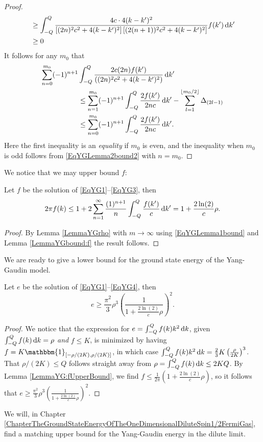 \begin{proof}
\begin{equation}
\begin{aligned}
&\geq \int_{-Q}^{Q}\frac{4c\cdot 4(k-k')^2}{\left[(2n)^2c^2+4(k-k')^2\right]\left[(2(n+1))^2c^2+4(k-k')^2\right]} f(k')\mathop{}\!\mathrm{d} k'\\
&\geq 0
\end{aligned}
\end{equation}
It follows for any $ m_0 $ that \begin{equation}
\begin{aligned}
\sum_{n=0}^{m_0}(-1)^{n+1}&\int_{-Q}^{Q}\frac{2c(2n) f(k')}{((2n)^2c^2+4(k-k')^2)}\mathop{}\!\mathrm{d} k'\\
&\leq\sum_{n=1}^{m_0}(-1)^{n+1}\int_{-Q}^{Q}\frac{2 f(k')}{2nc}\mathop{}\!\mathrm{d} k'-\sum_{l=1}^{\left\lfloor m_0/2 \right\rfloor}\Delta_{(2l-1)}
\\
&\leq \sum_{n=0}^{m_0}(-1)^{n+1}\int_{-Q}^{Q}\frac{2 f(k')}{2nc}\mathop{}\!\mathrm{d} k'.
\end{aligned}
\end{equation}
Here the first inequality is an \emph{equality} if $ m_0 $ is even, and the inequality when $ m_0 $ is odd follows from \eqref{EqYGLemma2bound2} with $ n=m_0 $.
\end{proof}
 We notice that we may upper bound $ f $:
 \begin{lemma}\label{LemmaYG:fUpperBound}
 	Let $ f $ be the solution of \eqref{EqYG1}--\eqref{EqYG3}, then
 	\begin{equation}
 	\begin{aligned}
 	2\pi  f(k) \leq 1+2\sum_{n=1}^{\infty}\frac{(1)^{n+1}}{n}\int_{-Q}^{Q}\frac{ f(k')}{c}\mathop{}\!\mathrm{d} k'=1+\frac{2\ln(2)}{c} \rho.
 	\end{aligned}
 	\end{equation}
 \end{lemma}
\begin{proof}
	By Lemma \ref{LemmaYGrho} with $ m\to\infty $ using \eqref{EqYGLemma1bound} and Lemma \ref{LemmaYGbound:f} the result follows. 
\end{proof}
We are ready to give a lower bound for the ground state energy of the Yang-Gaudin model. 
\begin{proposition}\label{PropositionYGLowerBound}
	Let $ e $ be the solution of \eqref{EqYG1}--\eqref{EqYG4}, then\begin{equation}
	e\geq \frac{\pi^2}{3}\rho ^3\left(\frac{1}{1+\frac{2\ln(2)}{c}\rho}\right)^2.
	\end{equation}
\end{proposition}
\begin{proof}
	We notice that the expression for $ e=\int_{-Q}^{Q}f(k)k^2\mathop{}\!\mathrm{d} k $, given $ \int_{-Q}^{Q}f(k)\mathop{}\!\mathrm{d} k=\rho $ \emph{and} $ f\leq K $, is minimized by having $ f=K\mathbbm{1}_{[-\rho/(2K),\rho /(2K)]} $, in which case $ \int_{-Q}^{Q}f(k)k^2\mathop{}\!\mathrm{d} k=\frac{2}{3}K\left(\frac{\rho}{2K}\right)^3 $. That $ \rho/(2K)\leq Q $ follows straight away from $ \rho =\int_{-Q}^{Q}f(k)\mathop{}\!\mathrm{d} k \leq 2KQ $.
	By Lemma \ref{LemmaYG:fUpperBound}, we find $ f\leq \frac{1}{2\pi}\left(1+\frac{2\ln(2)}{c}\rho\right) $, so it follows that $ e\geq \frac{\pi^2}{3}\rho ^3\left(\frac{1}{1+\frac{2\ln(2)}{c}\rho}\right)^2 $.
\end{proof}
We will, in Chapter \ref{ChapterTheGroundStateEnergyOfTheOneDimensionalDiluteSpin1/2FermiGas}, find a matching upper bound for the Yang-Gaudin energy in the dilute limit.
